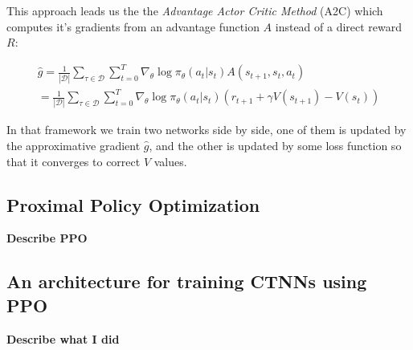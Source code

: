 This approach leads us the the \textit{Advantage Actor Critic Method} (A2C) which computes it's gradients from an advantage function $A$ instead of a direct reward $R$:

\begin{align*}
    \hat{g} = \frac{1}{|\mathcal{D}|} \sum_{\tau \in \mathcal{D}} \sum_{t=0}^{T} \nabla_\theta \log \pi_\theta (a_t|s_t) A(s_{t+1},s_t,a_t)\\
    = \frac{1}{|\mathcal{D}|} \sum_{\tau \in \mathcal{D}} \sum_{t=0}^{T} \nabla_\theta \log \pi_\theta (a_t|s_t) (r_{t+1} + \gamma V(s_{t+1}) - V(s_t))
\end{align*}

In that framework we train two networks side by side, one of them is updated by the approximative gradient $\hat{g}$, and the other is updated by some loss function so that it converges to correct $V$ values.

\subsection{Proximal Policy Optimization}

\textbf{Describe PPO}

\subsection{An architecture for training CTNNs using PPO}

\textbf{Describe what I did}

